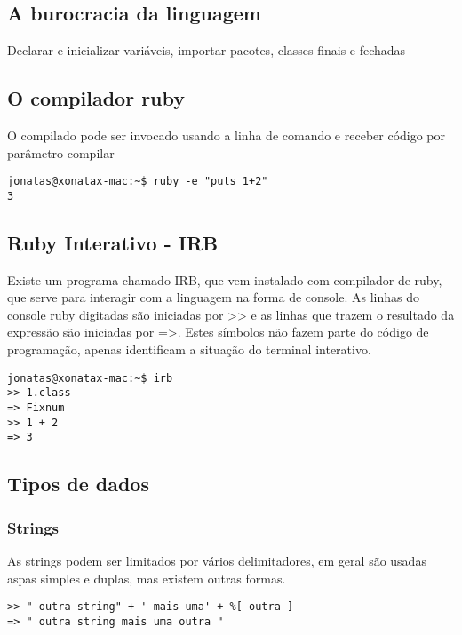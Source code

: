 \documentclass[12pt]{article}
\begin{document}
\subsection { A burocracia da linguagem }

Declarar e inicializar variáveis, importar pacotes, classes finais e fechadas 

\subsection { O compilador ruby }

O compilado pode ser invocado usando a linha de comando e receber código por parâmetro compilar

\begin{lstlisting}[caption=Usando o compilador na linha de comando]
jonatas@xonatax-mac:~$ ruby -e "puts 1+2"
3
\end{lstlisting}

\subsection { Ruby Interativo - IRB }

Existe um programa chamado IRB, que vem instalado com compilador de ruby, que serve para interagir com a linguagem na forma de console. As linhas do console ruby digitadas são iniciadas por >> e as linhas que trazem o resultado da expressão são iniciadas por =>. Estes símbolos não fazem parte do código de programação, apenas identificam a situação do terminal interativo.

\begin{lstlisting}[caption=Usando o compilador na linha de comando]
jonatas@xonatax-mac:~$ irb
>> 1.class
=> Fixnum
>> 1 + 2
=> 3
\end{lstlisting}

\subsection { Tipos de dados }

\subsubsection { Strings }

As strings podem ser limitados por vários delimitadores, em geral são usadas aspas simples e duplas, mas existem outras formas.

\begin{lstlisting}[caption=Exemplos de uso de string]
>> " outra string" + ' mais uma' + %[ outra ]
=> " outra string mais uma outra "
\end{lstlisting}
\end{document}
